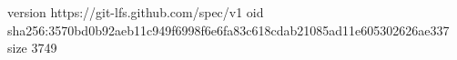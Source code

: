 version https://git-lfs.github.com/spec/v1
oid sha256:3570bd0b92aeb11c949f6998f6e6fa83c618cdab21085ad11e605302626ae337
size 3749
